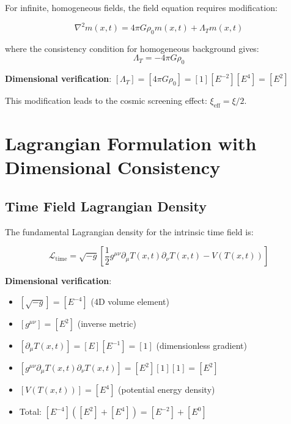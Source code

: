 \documentclass[12pt,a4paper]{article}
\newcommand{\Tfield}{T(x,t)}
\newcommand{\mfield}{m(x,t)}
\theoremstyle{definition}
\theoremstyle{remark}
\begin{document}
	For infinite, homogeneous fields, the field equation requires modification:
	
	\begin{equation}
		\nabla^2 \mfield = 4\pi G \rho_0 \mfield + \Lambda_T \mfield
		\label{eq:modified_field_equation}
	\end{equation}
	
	where the consistency condition for homogeneous background gives:
	\begin{equation}
		\Lambda_T = -4\pi G \rho_0
		\label{eq:lambda_t_definition}
	\end{equation}
	
	\textbf{Dimensional verification}: $[\Lambda_T] = [4\pi G \rho_0] = [1][E^{-2}][E^4] = [E^2]$ \checkmark
	
	This modification leads to the cosmic screening effect: $\xi_{\text{eff}} = \xi/2$.
	
	\section{Lagrangian Formulation with Dimensional Consistency}
	\label{sec:lagrangian_formulation}
	
	\subsection{Time Field Lagrangian Density}
	\label{subsec:time_field_lagrangian}
	
	The fundamental Lagrangian density for the intrinsic time field is:
	
	\begin{equation}
		\mathcal{L}_{\text{time}} = \sqrt{-g} \left[\frac{1}{2} g^{\mu\nu} \partial_\mu \Tfield \partial_\nu \Tfield - V(\Tfield)\right]
		\label{eq:time_field_lagrangian}
	\end{equation}
	
	\textbf{Dimensional verification}:
	\begin{itemize}
		\item $[\sqrt{-g}] = [E^{-4}]$ (4D volume element)
		\item $[g^{\mu\nu}] = [E^2]$ (inverse metric)
		\item $[\partial_\mu \Tfield] = [E][E^{-1}] = [1]$ (dimensionless gradient)
		\item $[g^{\mu\nu} \partial_\mu \Tfield \partial_\nu \Tfield] = [E^2][1][1] = [E^2]$
		\item $[V(\Tfield)] = [E^4]$ (potential energy density)
		\item Total: $[E^{-4}]([E^2] + [E^4]) = [E^{-2}] + [E^0]$ \checkmark
	\end{itemize}
	
\end{document}
